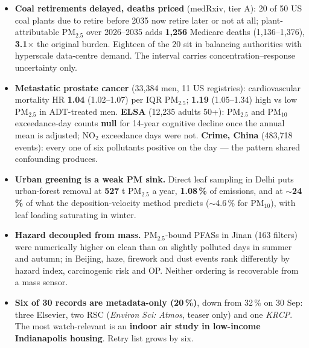 \documentclass[10pt]{article}
\begin{document}
\footnotesize
\begin{itemize}

\item \textbf{Coal retirements delayed, deaths priced} (medRxiv, tier A): 20 of 50 US coal plants due to retire
before 2035 now retire later or not at all; plant-attributable PM$_{2.5}$ over 2026--2035 adds
\textbf{1,256} Medicare deaths (1,136--1,376), \textbf{3.1$\times$} the original burden. Eighteen of the
20 sit in balancing authorities with hyperscale data-centre demand. The interval carries
concentration--response uncertainty only.

\item \textbf{Metastatic prostate cancer} (33,384 men, 11 US registries): cardiovascular mortality HR
\textbf{1.04} (1.02--1.07) per IQR PM$_{2.5}$; \textbf{1.19} (1.05--1.34) high vs low PM$_{2.5}$ in
ADT-treated men. \textbf{ELSA} (12,235 adults 50+): PM$_{2.5}$ and PM$_{10}$ exceedance-day counts
\textbf{null} for 14-year cognitive decline once the annual mean is adjusted; NO$_2$ exceedance days were not.
\textbf{Crime, China} (483,718 events): every one of six pollutants positive on the day --- the pattern
shared confounding produces.

\item \textbf{Urban greening is a weak PM sink.} Direct leaf sampling in Delhi puts urban-forest removal at
\textbf{527} t PM$_{2.5}$ a year, \textbf{1.08\,\%} of emissions, and at \textbf{$\sim$24\,\%} of what the
deposition-velocity method predicts ($\sim$4.6\,\% for PM$_{10}$), with leaf loading saturating in winter.

\item \textbf{Hazard decoupled from mass.} PM$_{2.5}$-bound PFASs in Jinan (163 filters) were numerically
higher on clean than on slightly polluted days in summer and autumn; in Beijing, haze, firework and dust
events rank differently by hazard index, carcinogenic risk and OP. Neither ordering is recoverable from a
mass sensor.

\item \textbf{Six of 30 records are metadata-only (20\,\%)}, down from 32\,\% on 30 Sep: three Elsevier, two
RSC (\textit{Environ Sci: Atmos}, teaser only) and one \textit{KRCP}. The most watch-relevant is an
\textbf{indoor air study in low-income Indianapolis housing}. Retry list grows by six.

\end{itemize}

\vspace{2mm}
\end{document}
